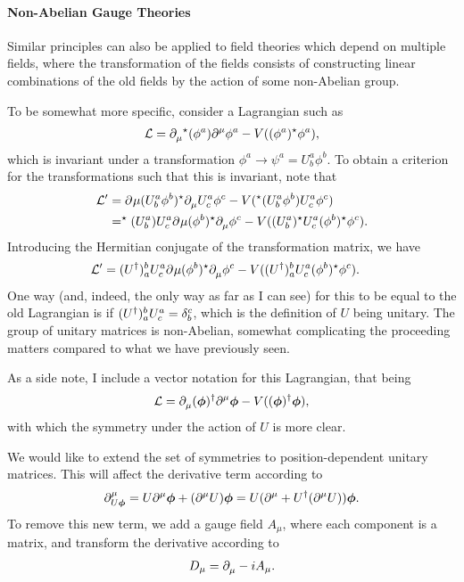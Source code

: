 \paragraph{Non-Abelian Gauge Theories}
Similar principles can also be applied to field theories which depend on multiple fields, where the transformation of the fields consists of constructing linear combinations of the old fields by the action of some non-Abelian group.

To be somewhat more specific, consider a Lagrangian such as
\begin{align*}
	\mathcal{L} = \partial^{}_{\mu}{^{\star}{(\phi^{a})}}\partial^{\mu}_{}{\phi^{a}} - V((\phi^{a})^{\star}\phi^{a}),
\end{align*}
which is invariant under a transformation $\phi^{a} \to \psi^{a} = U_{b}^{a}\phi^{b}$. To obtain a criterion for the transformations such that this is invariant, note that
\begin{align*}
	\mathcal{L}^{\prime} &= \partial^{}_{}{\mu}{(U_{b}^{a}\phi^{b})^{\star}}\partial^{}_{\mu}{}U_{c}^{a}\phi^{c} - V(^{\star}{(U_{b}^{a}\phi^{b})}U_{c}^{a}\phi^{c}) \\
	              &= ^{\star}{(U_{b}^{a})}U_{c}^{a}\partial^{}_{}{\mu}(\phi^{b})^{\star}\partial^{}_{\mu}{}\phi^{c} - V((U_{b}^{a})^{\star} U_{c}^{a}(\phi^{b})^{\star}\phi^{c}).
\end{align*}
Introducing the Hermitian conjugate of the transformation matrix, we have
\begin{align*}
	\mathcal{L}^{\prime} &= (U^{\dagger})_{a}^{b}U_{c}^{a}\partial^{}_{}{\mu}(\phi^{b})^{\star}\partial^{}_{\mu}{}\phi^{c} - V((U^{\dagger})_{a}^{b}U_{c}^{a}(\phi^{b})^{\star}\phi^{c}).
\end{align*}
One way (and, indeed, the only way as far as I can see) for this to be equal to the old Lagrangian is if $(U^{\dagger})_{a}^{b}U_{c}^{a} = \kdelta{c}{b}$, which is the definition of $U$ being unitary. The group of unitary matrices is non-Abelian, somewhat complicating the proceeding matters compared to what we have previously seen.

As a side note, I include a vector notation for this Lagrangian, that being
\begin{align*}
	\mathcal{L} = \partial^{}_{\mu}{(\vb*{\phi})^{\dagger}}\partial^{\mu}_{}{\vb*{\phi}} - V((\vb*{\phi})^{\dagger}\vb*{\phi}),
\end{align*}
with which the symmetry under the action of $U$ is more clear.

We would like to extend the set of symmetries to position-dependent unitary matrices. This will affect the derivative term according to
\begin{align*}
	\partial^{\mu}_{U\vb*{\phi}} = U\partial^{\mu}_{}{\vb*{\phi}} + (\partial^{\mu}_{}{U})\vb*{\phi} = U(\partial^{\mu}_{}{} + U^{\dagger}(\partial^{\mu}_{}{U}))\vb*{\phi}.
\end{align*}
To remove this new term, we add a gauge field $A_{\mu}$, where each component is a matrix, and transform the derivative according to
\begin{align*}
	D_{\mu} = \partial^{}_{\mu}{} - iA_{\mu}.
\end{align*}

